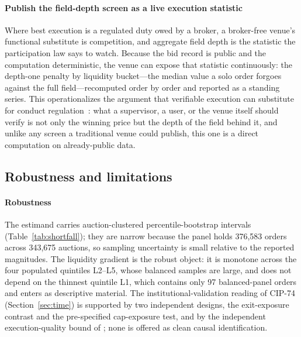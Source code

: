 \documentclass[11pt]{article}
\theoremstyle{plain}
\theoremstyle{definition}
\theoremstyle{remark}
\begin{document}
\paragraph{Publish the field-depth screen as a live execution statistic} Where best execution is a regulated duty owed by a broker, a broker-free venue's functional substitute is competition, and aggregate field depth is the statistic the participation law says to watch. Because the bid record is public and the computation deterministic, the venue can expose that statistic continuously: the depth-one penalty by liquidity bucket---the median value a solo order forgoes against the full field---recomputed order by order and reported as a standing series. This operationalizes the argument that verifiable execution can substitute for conduct regulation~\citep{le2026fairness}: what a supervisor, a user, or the venue itself should verify is not only the winning price but the depth of the field behind it, and unlike any screen a traditional venue could publish, this one is a direct computation on already-public data.

\subsection{Robustness and limitations}\label{sec:limits}

\paragraph{Robustness} The estimand carries auction-clustered percentile-bootstrap intervals (Table~\ref{tab:shortfall}); they are narrow because the panel holds 376{,}583 orders across 343{,}675 auctions, so sampling uncertainty is small relative to the reported magnitudes. The liquidity gradient is the robust object: it is monotone across the four populated quintiles L2--L5, whose balanced samples are large, and does not depend on the thinnest quintile L1, which contains only 97 balanced-panel orders and enters as descriptive material. The institutional-validation reading of CIP-74 (Section~\ref{sec:time}) is supported by two independent designs, the exit-exposure contrast and the pre-specified cap-exposure test, and by the independent execution-quality bound of \citet{zhang2026incentives}; none is offered as clean causal identification.
\end{document}
